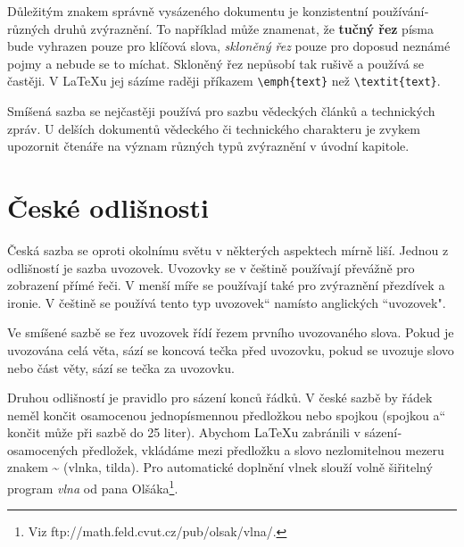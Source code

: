 \documentclass[11pt,a4paper,twocolumn]{article}
\providecommand{\uv}[1]{\quotedblbase #1\textquotedblleft}
\newcommand{\latex}{\LaTeX\xspace}
\begin{document}
Důležitým znakem správně vysázeného dokumentu je konzistentní použí­vání­ různých druhů zvýraznění­. To napří­klad může znamenat, že \textbf{tučný řez} pí­sma bude vyhrazen pouze pro klíčová slova, \textit{skloněný řez} pouze pro doposud neznámé pojmy a nebude se to míchat. Skloněný řez nepůsobí­ tak rušivě a používá se častěji. V {\latex}u jej sází­me raději pří­kazem \verb|\emph{text}| než \verb|\textit{text}|.

Smíšená sazba se nejčastěji používá pro sazbu vědeckých článků a technických zpráv. U delší­ch dokumentů vědeckého či technického charakteru je zvykem upozornit čtenáře na význam různých typů zvýraznění­ v úvodní­ kapitole.

\section{České odlišnosti}

Česká sazba se oproti okolní­mu světu v některých aspektech mí­rně liší­. Jednou z odlišností je sazba uvozovek. Uvozovky se v češtině použí­vají­ převážně pro zobrazení­ pří­mé řeči. V menší­ míře se použí­vají­ také pro zvýraznění­ přezdí­vek a ironie. V češtině se použí­vá tento \uv{typ uvozovek} namísto anglických ``uvozovek".

Ve smíšené sazbě se řez uvozovek ří­dí­ řezem první­ho uvozovaného slova. Pokud je uvozována celá věta, sází­ se koncová tečka před uvozovku, pokud se uvozuje slovo nebo část věty, sází­ se tečka za uvozovku.

Druhou odlišností je pravidlo pro sázení­ konců řádků. V české sazbě by řádek neměl končit osamocenou jednopí­smennou předložkou nebo spojkou (spojkou \uv{a} končit může při sazbě do 25 liter). Abychom {\latex}u zabránili v sázení­ osamocených předložek, vkládáme mezi předložku a slovo nezlomitelnou mezeru znakem \hspace{0.1cm} \textasciitilde \hspace{0.1cm} (vlnka, tilda). Pro automatické doplnění vlnek slouží­ volně šiřitelný program \hspace{0.1cm} \textit{vlna} od pana Olšáka\footnote{Viz ftp://math.feld.cvut.cz/pub/olsak/vlna/.}.
\end{document}
